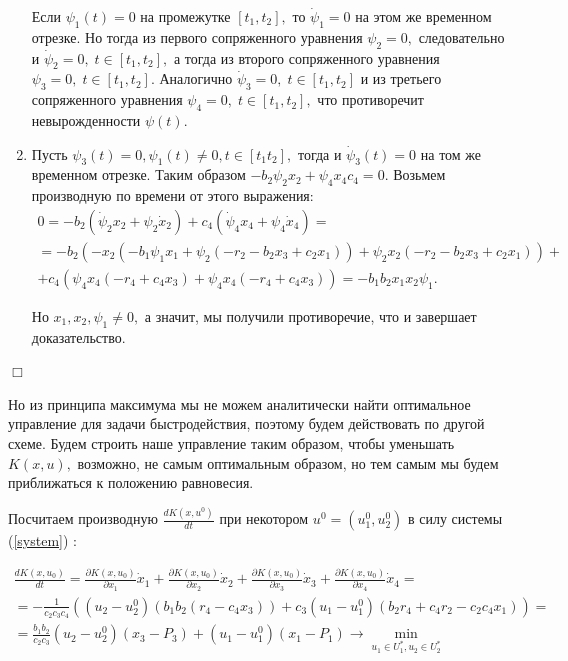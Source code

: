 \documentclass[11pt]{article}
\newenvironment{Proof}
{\par\noindent{\bf Доказательство.\\}} 
{\begin{flushright}$\Box$\end{flushright}}
\newcommand\Ref[1]{(\ref{#1})}
\newcommand\RS{\Ref{system} }
\newcommand\dd[2]{\frac{\partial#1}{\partial#2}}
\begin{document}
\begin{Proof}
\begin{enumerate}
        Если $\psi_1(t) = 0$ на промежутке $[t_1, t_2],$ то $\dot \psi_1 = 0$ на этом же временном отрезке. Но тогда из первого сопряженного уравнения $\psi_2 = 0,$ следовательно и $\dot \psi_2 = 0, \;  t \in [t_1, t_2],$ а тогда из второго сопряженного уравнения $\psi_3 = 0, \;  t \in [t_1, t_2].$ Аналогично $\dot \psi_3 = 0, \;  t \in [t_1, t_2]$ и из третьего сопряженного уравнения $\psi_4 = 0, \;  t \in [t_1, t_2],$ что противоречит невырожденности $\psi(t).$
        
    \item
    	Пусть $\psi_3(t) = 0, \psi_1(t) \ne 0, t \in [t_1 t_2],$ тогда и $\dot \psi_3(t) = 0$ на том же временном отрезке. Таким образом $-b_2\psi_2x_2 + \psi_4x_4c_4 = 0.$ Возьмем производную по времени от этого выражения:
    	\begin{multline*}
    		0 = -b_2(\dot \psi_2x_2 + \psi_2 \dot x_2) + c_4(\dot \psi_4 x_4 + \psi_4 \dot x_4) = \\
    		= -b_2(-x_2(-b_1\psi_1x_1 + \psi_2(-r_2 - b_2x_3 + c_2x_1)) + \psi_2 x_2(-r_2 - b_2x_3 + c_2x_1)) + \\
    		+ c_4(\psi_4x_4(-r_4 + c_4x_3) + \psi_4x_4(-r_4 + c_4x_3)) = -b_1b_2x_1x_2\psi_1.
    	\end{multline*}
    	
    	Но $x_1, x_2, \psi_1 \ne 0,$ а значит, мы получили противоречие, что и завершает доказательство.
    
    \end{enumerate}    
\end{Proof}

	Но из принципа максимума мы не можем аналитически найти оптимальное управление для задачи быстродействия, поэтому будем действовать по другой схеме. Будем строить наше управление таким образом, чтобы уменьшать $K(x,u),$ возможно, не самым оптимальным образом, но тем самым мы будем приближаться к положению равновесия.

Посчитаем производную $\frac{dK(x,u^0)}{dt}$ при некотором $u^0 = (u_1^0, u_2^0)$ в силу системы \RS:

\begin{multline*}
    \frac{dK(x,u_0)}{dt} = \dd{K(x,u_0)}{x_1}\dot x_1 + \dd{K(x,u_0)}{x_2}\dot x_2 + \dd{K(x,u_0)}{x_3}\dot x_3 + \dd{K(x,u_0)}{x_4}\dot x_4 = \\
    = -\frac{1}{c_2c_3c_4}\left((u_2 - u_2^0)(b_1b_2(r_4 - c_4x_3)) + c_3(u_1 - u_1^0)(b_2r_4 + c_4r_2 - c_2c_4x_1)\right) = \\
    = \frac{b_1b_2}{c_2c_3}(u_2 - u_2^0)(x_3 - P_3) + (u_1 - u_1^0)(x_1 - P_1) \to \min\limits_{u_1 \in U_1^*, u_2 \in U_2^*}
\end{multline*}
\end{document}
